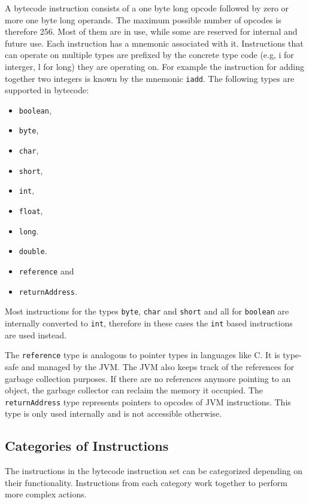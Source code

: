 A bytecode instruction consists of a one byte long opcode followed by zero or more one byte long operands. The maximum possible number of opcodes is therefore 256. Most of them are in use, while some are reserved for internal and future use. Each instruction has a mnemonic associated with it. Instructions that can operate on multiple types are prefixed by the concrete type code (e.g, i for interger, l for long) they are operating on. For example the instruction for adding together two integers is known by the mnemonic \texttt{iadd}. The following types are supported in bytecode:

\begin{itemize}
    \item \texttt{boolean},
    \item \texttt{byte},
    \item \texttt{char},
    \item \texttt{short},
    \item \texttt{int},
    \item \texttt{float},
    \item \texttt{long}.
    \item \texttt{double}.
    \item \texttt{reference} and
    \item \texttt{returnAddress}.

\end{itemize}

Most instructions for the types \texttt{byte}, \texttt{char} and \texttt{short} and all for \texttt{boolean} are internally converted to \texttt{int}, therefore in these cases the \texttt{int} based instructions are used instead.

The \texttt{reference} type is analogous to pointer types in languages like C. It is type-safe and managed by the JVM. The JVM also keeps track of the references for garbage collection purposes. If there are no references anymore pointing to an object, the garbage collector can reclaim the memory it occupied. The \texttt{returnAddress} type represents pointers to opcodes of JVM instructions. This type is only used internally and is not accessible otherwise.


\subsection{Categories of Instructions}

The instructions in the bytecode instruction set can be categorized depending on their functionality. Instructions from each category work together to perform more complex actions. 

